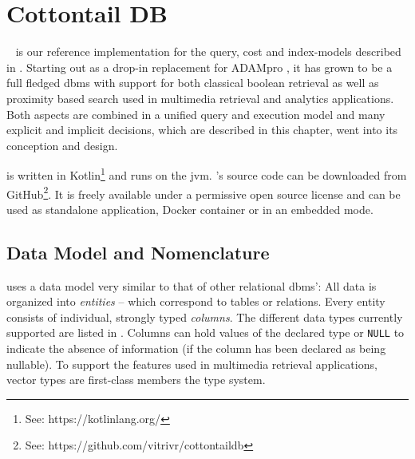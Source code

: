 \chapter{Cottontail DB}

\label{chapter:cottontaildb}

\cottontail{}~\cite{Gasser:2020Cottontail} is our reference implementation for the query, cost and index-models described in . Starting out as a drop-in replacement for ADAMpro \cite{Giangreco:2016adam}, it has grown to be a full fledged \acrshort{dbms} with support for both classical boolean retrieval as well as proximity based search used in multimedia retrieval and analytics applications. Both aspects are combined in a unified query and execution model and many explicit and implicit decisions, which are described in this chapter, went into its conception and design.

\cottontail{} is written in Kotlin\footnote{See: https://kotlinlang.org/} and runs on the \acrfull{jvm}. \cottontail{}'s source code can be downloaded from GitHub\footnote{See: https://github.com/vitrivr/cottontaildb}. It is freely available under a permissive open source license and can be used as standalone application, Docker container or in an embedded mode.

\section{Data Model and Nomenclature} 

\cottontail{} uses a data model very similar to that of other relational \acrshort{dbms}': All data is organized into \emph{entities} -- which correspond to tables or relations. Every entity consists of individual, strongly typed \emph{columns}. The different data types currently supported are listed in . Columns can hold values of the declared type or \texttt{NULL} to indicate the absence of information (if the column has been declared as being nullable). To support the features used in multimedia retrieval applications, vector types are first-class members the type system.

